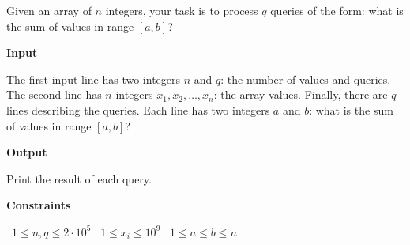 Given an array of $n$ integers, your task is to process $q$ queries of the form: what is the sum of values in range $[a,b]$?

\vspace{0.3cm}\noindent\textbf{Input}

The first input line has two integers $n$ and $q$: the number of values and queries.
The second line has $n$ integers $x_1,x_2,\dots,x_n$: the array values.
Finally, there are $q$ lines describing the queries. Each line has two integers $a$ and $b$: what is the sum of values in range $[a,b]$?

\vspace{0.3cm}\noindent\textbf{Output}

Print the result of each query.

\vspace{0.3cm}\noindent\textbf{Constraints}

\textbullet\ $1 \le n,q \le 2 \cdot 10^5$
\textbullet\ $1 \le x_i \le 10^9$
\textbullet\ $1 \le a \le b \le n$